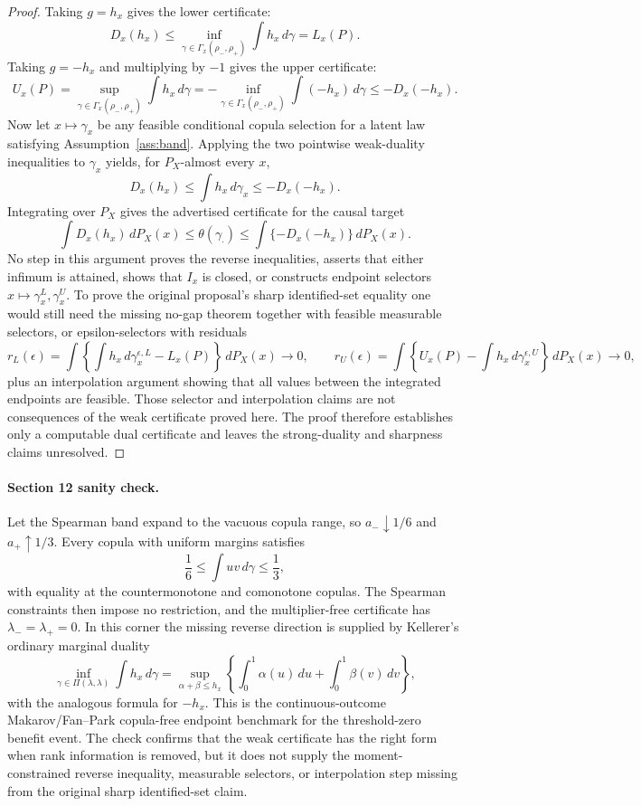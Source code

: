 \begin{proof}
Taking \(g=h_x\) gives the lower certificate:
\[
D_x(h_x)\le
\inf_{\gamma\in\Gamma_x(\rho_-,\rho_+)}\int h_x\,d\gamma
=L_x(P).
\]
Taking \(g=-h_x\) and multiplying by \(-1\) gives the upper certificate:
\[
U_x(P)
=\sup_{\gamma\in\Gamma_x(\rho_-,\rho_+)}\int h_x\,d\gamma
=-\inf_{\gamma\in\Gamma_x(\rho_-,\rho_+)}\int (-h_x)\,d\gamma
\le -D_x(-h_x).
\]
Now let \(x\mapsto\gamma_x\) be any feasible conditional copula selection for a latent law satisfying Assumption~\ref{ass:band}.  Applying the two pointwise weak-duality inequalities to \(\gamma_x\) yields, for \(P_X\)-almost every \(x\),
\[
D_x(h_x)\le \int h_x\,d\gamma_x\le -D_x(-h_x).
\]
Integrating over \(P_X\) gives the advertised certificate for the causal target
\[
\int D_x(h_x)\,dP_X(x)\le
\theta(\gamma_\cdot)
\le \int\{-D_x(-h_x)\}\,dP_X(x).
\]
No step in this argument proves the reverse inequalities, asserts that either infimum is attained, shows that \(I_x\) is closed, or constructs endpoint selectors \(x\mapsto\gamma_x^L,\gamma_x^U\).  To prove the original proposal's sharp identified-set equality one would still need the missing no-gap theorem together with feasible measurable selectors, or epsilon-selectors with residuals
\[
r_L(\epsilon)=\int\left\{\int h_x\,d\gamma_x^{\epsilon,L}-L_x(P)\right\}\,dP_X(x)\to0,\qquad
r_U(\epsilon)=\int\left\{U_x(P)-\int h_x\,d\gamma_x^{\epsilon,U}\right\}\,dP_X(x)\to0,
\]
plus an interpolation argument showing that all values between the integrated endpoints are feasible.  Those selector and interpolation claims are not consequences of the weak certificate proved here.  The proof therefore establishes only a computable dual certificate and leaves the strong-duality and sharpness claims unresolved.
\end{proof}

\paragraph{Section 12 sanity check.}
Let the Spearman band expand to the vacuous copula range, so \(a_-\downarrow1/6\) and \(a_+\uparrow1/3\).  Every copula with uniform margins satisfies
\[
\frac16\le \int uv\,d\gamma\le \frac13,
\]
with equality at the countermonotone and comonotone copulas.  The Spearman constraints then impose no restriction, and the multiplier-free certificate has \(\lambda_-=\lambda_+=0\).  In this corner the missing reverse direction is supplied by Kellerer's ordinary marginal duality
\[
\inf_{\gamma\in\Pi(\lambda,\lambda)}\int h_x\,d\gamma
=
\sup_{\alpha+\beta\le h_x}
\left\{\int_0^1\alpha(u)\,du+\int_0^1\beta(v)\,dv\right\},
\]
with the analogous formula for \(-h_x\).  This is the continuous-outcome Makarov/Fan--Park copula-free endpoint benchmark for the threshold-zero benefit event.  The check confirms that the weak certificate has the right form when rank information is removed, but it does not supply the moment-constrained reverse inequality, measurable selectors, or interpolation step missing from the original sharp identified-set claim.


